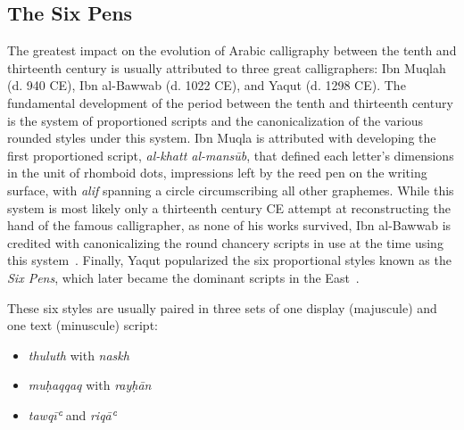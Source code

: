\subsection{The Six Pens}

The greatest impact on the evolution of Arabic calligraphy between the tenth
and thirteenth century is usually attributed to three great calligraphers: Ibn
Muqlah (d. 940 CE), Ibn al-Bawwab (d. 1022 CE), and Yaqut (d. 1298 CE). The
fundamental development of the period between the tenth and thirteenth century
is the system of proportioned scripts and the canonicalization of the various
rounded styles under this system. Ibn Muqla is attributed with developing the
first proportioned script, \emph{al-khatt al-mansūb}, that defined each
letter's dimensions in the unit of rhomboid dots, impressions left by the reed
pen on the writing surface, with \emph{alif} spanning a circle circumscribing
all other graphemes. While this system is most likely only a thirteenth century
CE attempt at reconstructing the hand of the famous calligrapher, as none of
his works survived, Ibn al-Bawwab is credited with canonicalizing the round
chancery scripts in use at the time using this system~\cite[pg. 158-160,
213]{blair2006islamic}. Finally, Yaqut popularized the six proportional styles
known as the \emph{Six Pens}, which later became the dominant scripts in the
East~\cite[pg. 251]{gacek2009arabic}.

These six styles are usually paired in three sets of one display (majuscule)
and one text (minuscule) script:

\begin{itemize}
	\item \emph{thuluth} with \emph{naskh}
	\item \emph{muḥaqqaq} with \emph{rayḥān}
	\item \emph{tawqīʿ} and \emph{riqāʿ}
\end{itemize}

